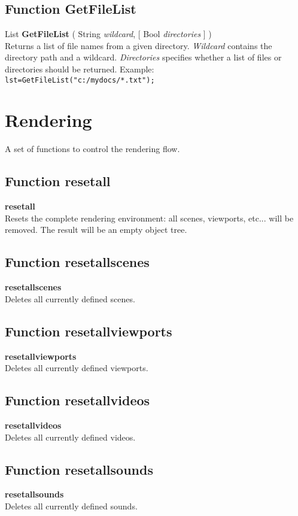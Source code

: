 \documentclass[10pt]{book}
\newcommand{\sourcecode}[1]{\texttt{#1}}
\newcommand{\var}[1]{\textit{#1}}
\begin{document}
\subsection{Function GetFileList \label{F:GetFileList}}
List \textbf{GetFileList} ( String \textit{wildcard},  [ Bool \textit{directories} ] ) \\
Returns a list of file names from a given directory. \var{Wildcard} contains the directory path and a wildcard. \var{Directories} specifies whether a list of files or directories should be returned.
Example: \\
\sourcecode{lst=GetFileList("c:/mydocs/*.txt");}

\section{Rendering \label{Rendering}}
A set of functions to control the rendering flow.

\subsection{Function resetall \label{F:resetall}}
\textbf{resetall} \\
Resets the complete rendering environment: all scenes, viewports, etc... will be removed. The result will be an empty object tree.

\subsection{Function resetallscenes \label{F:resetallscenes}}
\textbf{resetallscenes} \\
Deletes all currently defined scenes.

\subsection{Function resetallviewports \label{F:resetallviewports}}
\textbf{resetallviewports} \\
Deletes all currently defined viewports.

\subsection{Function resetallvideos \label{F:resetallvideos}}
\textbf{resetallvideos} \\
Deletes all currently defined videos.

\subsection{Function resetallsounds \label{F:resetallsounds}}
\textbf{resetallsounds} \\
Deletes all currently defined sounds.
\end{document}

